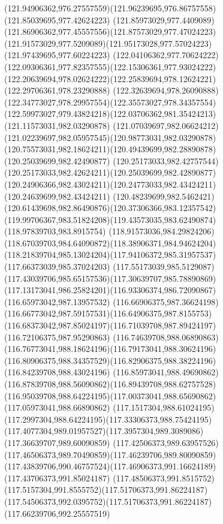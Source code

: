{{		\curveto(121.94906362,976.27557559)(121.96239695,976.86757558)(121.85039695,977.42624223)
		\curveto(121.85973029,977.4409089)(121.86906362,977.45557556)(121.87573029,977.47024223)
		\curveto(121.91573029,977.5209089)(121.95173028,977.57024223)(121.97439695,977.60224223)
		\curveto(122.04106362,977.70624222)(122.09306361,977.82357555)(122.15306361,977.93024222)
		\curveto(122.20639694,978.02624222)(122.25839694,978.12624221)(122.29706361,978.23290888)
		\curveto(122.32639694,978.26090888)(122.34773027,978.29957554)(122.35573027,978.34357554)
		\curveto(122.59973027,979.43824218)(122.03706362,981.35424213)(121.11573031,982.03290878)
		\curveto(121.07039697,982.06624212)(121.02239697,982.05957545)(120.98773031,982.03290878)
		\curveto(120.75573031,982.18624211)(120.49439699,982.28890878)(120.25039699,982.42490877)
		\curveto(120.25173033,982.42757544)(120.25173033,982.42624211)(120.25039699,982.42890877)
		\curveto(120.24906366,982.43024211)(120.24773033,982.43424211)(120.24639699,982.43424211)
		\curveto(120.48239699,982.5462421)(120.61439698,982.86490876)(120.37306366,983.12357542)
		\curveto(119.99706367,983.51824208)(119.43573035,983.62490874)(118.97839703,983.8915754)
		\curveto(118.91573036,984.29824206)(118.67039703,984.64090872)(118.38906371,984.94624204)
		\curveto(118.21839704,985.13024204)(117.94106372,985.31957537)(117.66373039,985.37024203)
		\curveto(117.55173039,985.5129087)(117.43039706,985.65157536)(117.30639707,985.78890869)
		\curveto(117.13173041,986.25824201)(116.93306374,986.72090867)(116.65973042,987.13957532)
		\curveto(116.66906375,987.36624198)(116.66773042,987.59157531)(116.64906375,987.8155753)
		\curveto(116.68373042,987.85024197)(116.71039708,987.89424197)(116.72106375,987.95290863)
		\curveto(116.74639708,988.06890863)(116.76773041,988.18624196)(116.79173041,988.30624196)
		\curveto(116.80906375,988.34357529)(116.82906375,988.38224196)(116.84239708,988.43024196)
		\curveto(116.85973041,988.49690862)(116.87839708,988.56090862)(116.89439708,988.62757528)
		\curveto(116.95039708,988.64224195)(117.00373041,988.65690862)(117.05973041,988.66890862)
		\curveto(117.1517304,988.61024195)(117.2997304,988.64224195)(117.33306373,988.75424195)
		\curveto(117.4077304,989.01957527)(117.3957304,989.3089086)(117.36639707,989.60090859)
		\curveto(117.42506373,989.63957526)(117.46506373,989.70490859)(117.46239706,989.80090859)
		\curveto(117.43839706,990.46757524)(117.46906373,991.16624189)(117.43706373,991.85024187)
		\curveto(117.48506373,991.8515752)(117.5157304,991.8555752)(117.51706373,991.86224187)
		\curveto(117.54506373,992.0395752)(117.51706373,991.86224187)(117.66239706,992.25557519)
}}
